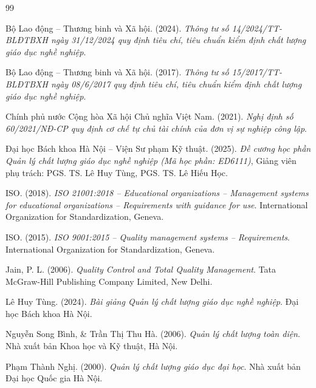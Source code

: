 \renewcommand{\refname}{Tài liệu tham khảo}

\begin{thebibliography}{99}

Bộ Lao động -- Thương binh và Xã hội. (2024). \textit{Thông tư số 14/2024/TT-BLĐTBXH ngày 31/12/2024 quy định tiêu chí, tiêu chuẩn kiểm định chất lượng giáo dục nghề nghiệp}.

Bộ Lao động -- Thương binh và Xã hội. (2017). \textit{Thông tư số 15/2017/TT-BLĐTBXH ngày 08/6/2017 quy định tiêu chí, tiêu chuẩn kiểm định chất lượng giáo dục nghề nghiệp}.

Chính phủ nước Cộng hòa Xã hội Chủ nghĩa Việt Nam. (2021). \textit{Nghị định số 60/2021/NĐ-CP quy định cơ chế tự chủ tài chính của đơn vị sự nghiệp công lập}.

Đại học Bách khoa Hà Nội -- Viện Sư phạm Kỹ thuật. (2025). \textit{Đề cương học phần Quản lý chất lượng giáo dục nghề nghiệp (Mã học phần: ED6111)}, Giảng viên phụ trách: PGS. TS. Lê Huy Tùng, PGS. TS. Lê Hiếu Học.

ISO. (2018). \textit{ISO 21001:2018 -- Educational organizations -- Management systems for educational organizations -- Requirements with guidance for use}. International Organization for Standardization, Geneva.

ISO. (2015). \textit{ISO 9001:2015 -- Quality management systems -- Requirements}. International Organization for Standardization, Geneva.

Jain, P. L. (2006). \textit{Quality Control and Total Quality Management}. Tata McGraw-Hill Publishing Company Limited, New Delhi.

Lê Huy Tùng. (2024). \textit{Bài giảng Quản lý chất lượng giáo dục nghề nghiệp}. Đại học Bách khoa Hà Nội.

Nguyễn Song Bình, \& Trần Thị Thu Hà. (2006). \textit{Quản lý chất lượng toàn diện}. Nhà xuất bản Khoa học và Kỹ thuật, Hà Nội.

Phạm Thành Nghị. (2000). \textit{Quản lý chất lượng giáo dục đại học}. Nhà xuất bản Đại học Quốc gia Hà Nội.


\end{thebibliography}
